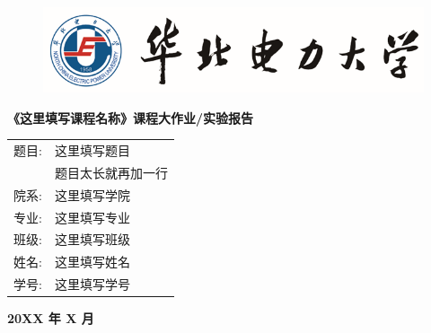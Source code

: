 \documentclass[UTF8,zihao=-4,linespread=1.5]{ctexart}
\begin{document}
\begin{titlepage}

    \vspace*{1cm}

    \begin{figure}[h]
        \centering
        \includegraphics[width=\textwidth]{image/xm_pic1.png}
    \end{figure}

    \vspace*{\fill}

    \begin{center}
         \kaishu \bfseries
        《这里填写课程名称》课程大作业/实验报告
    \end{center}

    \vspace{4cm}

    \begin{table}[h]
        \centering
         \kaishu \bfseries
        \begin{tabular}{rp{16em}<{\centering}}
            题目: & 这里填写题目    \\
            \cline{2-2}
                & 题目太长就再加一行 \\
            \cline{2-2}
            院系: & 这里填写学院    \\
            \cline{2-2}
            专业: & 这里填写专业    \\
            \cline{2-2}
            班级: & 这里填写班级    \\
            \cline{2-2}
            姓名: & 这里填写姓名    \\
            \cline{2-2}
            学号: & 这里填写学号    \\
            \cline{2-2}
        \end{tabular}
    \end{table}

    \vspace{1cm}

    \begin{center}
         \kaishu \bfseries
        20XX 年 X 月
    \end{center}

\end{titlepage}
\end{document}
